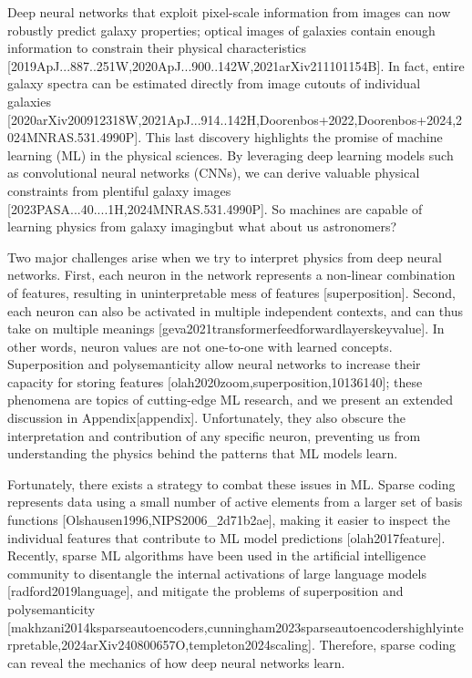 \documentclass[11pt,a4paper]{article}
\begin{document}
Deep neural networks that exploit pixel-scale information from images can now robustly predict galaxy properties; optical images of galaxies contain enough information to constrain their physical characteristics [2019ApJ...887..251W,2020ApJ...900..142W,2021arXiv211101154B]. In fact, entire galaxy spectra can be estimated directly from image cutouts of individual galaxies [2020arXiv200912318W,2021ApJ...914..142H,Doorenbos+2022,Doorenbos+2024,2024MNRAS.531.4990P]. This last discovery highlights the promise of machine learning (ML) in the physical sciences. By leveraging deep learning models such as convolutional neural networks (CNNs), we can derive valuable physical constraints from plentiful galaxy images [2023PASA...40....1H,2024MNRAS.531.4990P]. So machines are capable of learning physics from galaxy imagingbut what about us astronomers?

Two major challenges arise when we try to interpret physics from deep neural networks. First, each neuron in the network represents a non-linear combination of features, resulting in uninterpretable mess of features [superposition]. Second, each neuron can also be activated in multiple independent contexts, and can thus take on multiple meanings [geva2021transformerfeedforwardlayerskeyvalue]. In other words, neuron values are not one-to-one with learned concepts. Superposition and polysemanticity allow neural networks to increase their capacity for storing features [olah2020zoom,superposition,10136140]; these phenomena are topics of cutting-edge ML research, and we present an extended discussion in Appendix[appendix]. Unfortunately, they also obscure the interpretation and contribution of any specific neuron, preventing us from understanding the physics behind the patterns that ML models learn.

Fortunately, there exists a strategy to combat these issues in ML. Sparse coding represents data using a small number of active elements from a larger set of basis functions [Olshausen1996,NIPS2006\_2d71b2ae], making it easier to inspect the individual features that contribute to ML model predictions [olah2017feature]. Recently, sparse ML algorithms have been used in the artificial intelligence community to disentangle the internal activations of large language models [radford2019language], and mitigate the problems of superposition and polysemanticity [makhzani2014ksparseautoencoders,cunningham2023sparseautoencodershighlyinterpretable,2024arXiv240800657O,templeton2024scaling]. Therefore, sparse coding can reveal the mechanics of how deep neural networks learn.
\end{document}
